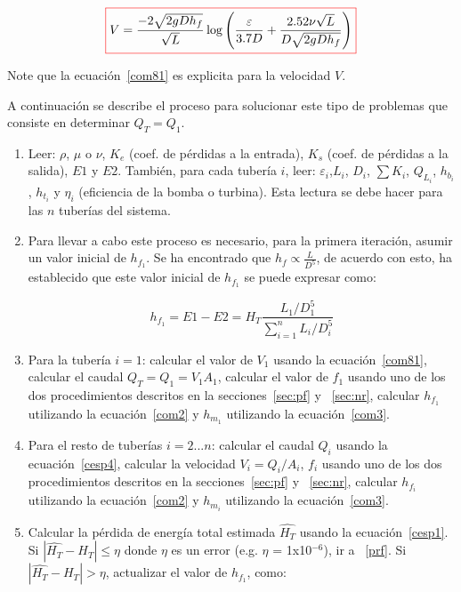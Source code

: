 \documentclass[10pt, oneside]{article}
\begin{document}
\begin{equation}
\color{red}\boxed{\color{black} V= \frac{-2\sqrt{2gD h_f}}{\sqrt{L}} \log \left( \frac{\varepsilon}{3.7D} + \frac{2.52 \nu \sqrt{L}}{D \sqrt{2gD h_f}} \right) }
\label{com81}
\end{equation}

Note que la ecuaci\'on~\ref{com81} es explicita para la velocidad $V$. 

A continuaci\'on se describe el proceso para solucionar este tipo de problemas que consiste en determinar $Q_T = Q_1$.

\begin{enumerate}
\item Leer: $\rho$, $\mu$ o $\nu$, $K_e$ (coef. de p\'erdidas a la entrada), $K_s$ (coef. de p\'erdidas a la salida), $E1$ y $E2$. Tambi\'en, para cada tuber\'ia $i$, leer: $\varepsilon_i$,$L_i$, $D_i$, $\sum K_i$, $Q_{L_i}$, $h_{b_i}$, $h_{t_i}$ y $\eta_i$ (eficiencia de la bomba o turbina). Esta lectura se debe hacer para las $n$ tuber\'ias del sistema.
\item Para llevar a cabo este proceso es necesario, para la primera iteraci\'on, asumir un valor inicial de $h_{f_1} $. Se ha encontrado que $h_f \propto \frac{L}{D^5}$, de acuerdo con esto, \cite{saldarriaga} ha establecido que este valor inicial de $h_{f_1}$ se puede expresar como:

\begin{equation} 
h_{f_1} = E1-E2 = H_T \frac{L_1 / D_1^5}{\sum_{i=1}^{n} L_i / D_i^5 }
\label{cpd1}
\end{equation}

\item \label{vve} Para la tuber\'ia $i=1$: calcular el valor de $V_1$ usando la ecuaci\'on~\ref{com81}, calcular el caudal $Q_T = Q_1 = V_1 A_1$, calcular el valor de $f_1$ usando uno de los dos procedimientos descritos en la secciones~\ref{sec:pf} y ~\ref{sec:nr}, calcular $h_{f_1}$ utilizando la ecuaci\'on~\ref{com2} y $h_{m_1}$  utilizando la ecuaci\'on~\ref{com3}.

\item Para el resto de tuber\'ias  $i = 2 ... n$: calcular el caudal $Q_i$ usando la ecuaci\'on~\ref{cesp4}, calcular la velocidad $V_i = Q_i /A_i$, $f_i$ usando uno de los dos procedimientos descritos en la secciones~\ref{sec:pf} y ~\ref{sec:nr}, calcular $h_{f_i}$ utilizando la ecuaci\'on~\ref{com2} y $h_{m_i}$  utilizando la ecuaci\'on~\ref{com3}.

\item Calcular la p\'erdida de energ\'ia total estimada $\hat{H_T}$ usando la ecuaci\'on~\ref{cesp1}. Si $|\hat{H_T} - H_T | \leq \eta$ donde $\eta$ es un error  (e.g. $\eta$ = 1x10$^{-6}$), ir a ~\ref{prf}. Si $|\hat{H_T} - H_T | > \eta$, actualizar el valor de $h_{f_1}$, como:


\end{enumerate}
\end{document}
